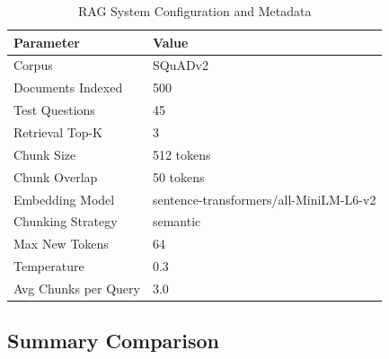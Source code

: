 \begin{table}[h]
\centering
\caption{RAG System Configuration and Metadata}
\label{tab:rag_config}
\begin{tabular}{@{}ll@{}}
\toprule
\textbf{Parameter} & \textbf{Value} \\
\midrule
Corpus & SQuADv2 \\
Documents Indexed & 500 \\
Test Questions & 45 \\
Retrieval Top-K & 3 \\
Chunk Size & 512 tokens \\
Chunk Overlap & 50 tokens \\
Embedding Model & sentence-transformers/all-MiniLM-L6-v2 \\
Chunking Strategy & semantic \\
Max New Tokens & 64 \\
Temperature & 0.3 \\
Avg Chunks per Query & 3.0 \\
\bottomrule
\end{tabular}
\end{table}

\newpage
\subsection{Summary Comparison}

